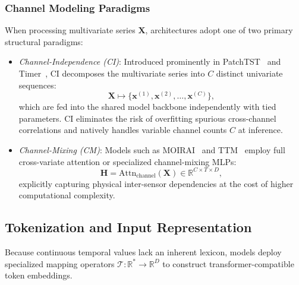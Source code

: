 \subsubsection{Channel Modeling Paradigms}
When processing multivariate series $\mathbf{X}$, architectures adopt one of two primary structural paradigms:
\begin{itemize}[leftmargin=*]
    \item \emph{Channel-Independence (CI)}: Introduced prominently in PatchTST~\cite{nie2023patchtst} and Timer~\cite{liu2024timer}, CI decomposes the multivariate series into $C$ distinct univariate sequences:
    \begin{equation}
        \mathbf{X} \mapsto \{\mathbf{x}^{(1)}, \mathbf{x}^{(2)}, \dots, \mathbf{x}^{(C)}\},
    \end{equation}
    which are fed into the shared model backbone independently with tied parameters. CI eliminates the risk of overfitting spurious cross-channel correlations and natively handles variable channel counts $C$ at inference.
    \item \emph{Channel-Mixing (CM)}: Models such as MOIRAI~\cite{woo2024moirai} and TTM~\cite{ekambaram2024ttm} employ full cross-variate attention or specialized channel-mixing MLPs:
    \begin{equation}
        \mathbf{H} = \text{Attn}_{\text{channel}}(\mathbf{X}) \in \mathbb{R}^{C \times T \times D},
    \end{equation}
    explicitly capturing physical inter-sensor dependencies at the cost of higher computational complexity.
\end{itemize}

\subsection{Tokenization and Input Representation}

Because continuous temporal values lack an inherent lexicon, models deploy specialized mapping operators $\mathcal{T}: \mathbb{R}^* \to \mathbb{R}^D$ to construct transformer-compatible token embeddings.

